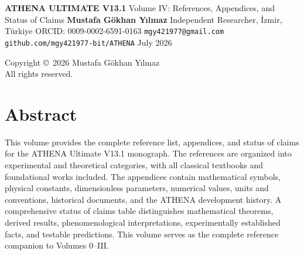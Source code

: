 \documentclass[12pt,oneside]{book}
\begin{document}
\frontmatter

\begin{titlepage}
\centering
\vspace*{1cm}
{\Huge\bfseries ATHENA ULTIMATE V13.1}
\vspace{0.5cm}
{\Large Volume IV: References, Appendices, and Status of Claims}
\vspace{2cm}
{\Large \textbf{Mustafa Gökhan Yılmaz}}
\vspace{0.3cm}
{\large Independent Researcher, İzmir, Türkiye}
\vspace{0.2cm}
{\large ORCID: 0009-0002-6591-0163}
\vspace{0.2cm}
{\large \texttt{mgy421977@gmail.com}}
\vspace{0.2cm}
{\large \texttt{github.com/mgy421977-bit/ATHENA}}
\vspace{2cm}
{\large July 2026}
\vfill
\end{titlepage}

\newpage
\thispagestyle{empty}
\vspace*{\fill}
\begin{center}
Copyright \copyright\ 2026 Mustafa Gökhan Yılmaz\\
All rights reserved.
\end{center}
\vspace*{\fill}

\chapter*{Abstract}

This volume provides the complete reference list, appendices, and status of claims for the ATHENA Ultimate V13.1 monograph. The references are organized into experimental and theoretical categories, with all classical textbooks and foundational works included. The appendices contain mathematical symbols, physical constants, dimensionless parameters, numerical values, units and conventions, historical documents, and the ATHENA development history. A comprehensive status of claims table distinguishes mathematical theorems, derived results, phenomenological interpretations, experimentally established facts, and testable predictions. This volume serves as the complete reference companion to Volumes 0--III.

\tableofcontents

\mainmatter
\end{document}
